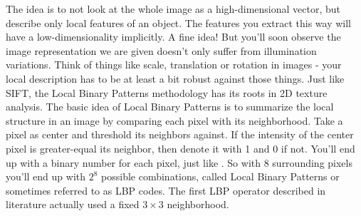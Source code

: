 The idea is to not look at the whole image as a high-dimensional vector, but describe only local features of an object. The features you extract this way will have a low-dimensionality implicitly. A fine idea! But you’ll soon observe the image representation we are given doesn’t only suffer from illumination variations. Think of things like scale, translation or rotation in images - your local description has to be at least a bit robust against those things. Just like {\ttfamily SIFT}, the Local Binary Patterns methodology has its roots in 2D texture analysis. The basic idea of Local Binary Patterns is to summarize the local structure in an image by comparing each pixel with its neighborhood. Take a pixel as center and threshold its neighbors against. If the intensity of the center pixel is greater-equal its neighbor, then denote it with 1 and 0 if not. You’ll end up with a binary number for each pixel, just like {}. So with 8 surrounding pixels you’ll end up with $2^8$ possible combinations, called Local Binary Patterns or sometimes referred to as LBP codes. The first LBP operator described in literature actually used a fixed $3 \times 3$ neighborhood.




